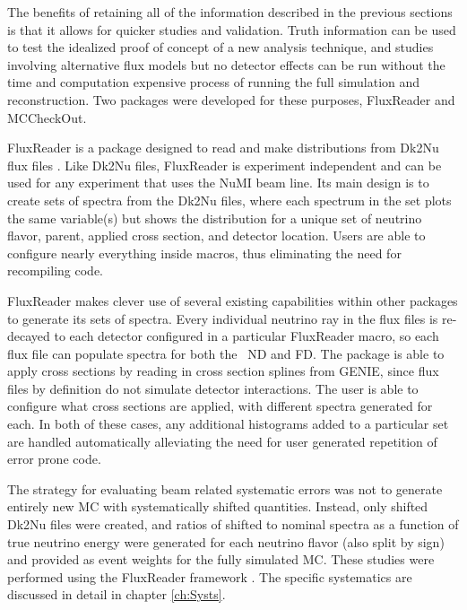The benefits of retaining all of the information described in the previous sections is that it allows for quicker studies and validation. Truth information can be used to test the idealized proof of concept of a new analysis technique, and studies involving alternative flux models but no detector effects can be run without the time and computation expensive process of running the full simulation and reconstruction. Two packages were developed for these purposes, FluxReader and MCCheckOut.

FluxReader is a package designed to read and make distributions from Dk2Nu flux files \cite{ref:TNFR}. Like Dk2Nu files, FluxReader is experiment independent and can be used for any experiment that uses the NuMI beam line. Its main design is to create sets of spectra from the Dk2Nu files, where each spectrum in the set plots the same variable(s) but shows the distribution for a unique set of neutrino flavor, parent, applied cross section, and detector location. Users are able to configure nearly everything inside macros, thus eliminating the need for recompiling code.

FluxReader makes clever use of several existing capabilities within other packages to generate its sets of spectra. Every individual neutrino ray in the flux files is re-decayed to each detector configured in a particular FluxReader macro, so each flux file can populate spectra for both the \nova~ND and FD. The package is able to apply cross sections by reading in cross section splines from GENIE, since flux files by definition do not simulate detector interactions. The user is able to configure what cross sections are applied, with different spectra generated for each. In both of these cases, any additional histograms added to a particular set are handled automatically alleviating the need for user generated repetition of error prone code.

The strategy for evaluating beam related systematic errors was not to generate entirely new MC with systematically shifted quantities. Instead, only shifted Dk2Nu files were created, and ratios of shifted to nominal spectra as a function of true neutrino energy were generated for each neutrino flavor (also split by sign) and provided as event weights for the fully simulated MC. These studies were performed using the FluxReader framework \cite{ref:TNBeam}. The specific systematics are discussed in detail in chapter \ref{ch:Systs}.

